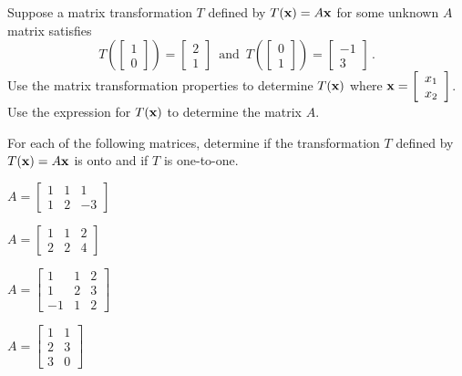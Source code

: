 \item Suppose a matrix transformation $T$ defined by $T(\mathbf{x})=A\mathbf{x}$ for some unknown $A$ matrix satisfies 
\[ T\left( \left[ \begin{array}{c} 1 \\ 0 \end{array} \right] \right) = \left[ \begin{array}{c} 2\\ 1\end{array} \right] \, \text{ and } \, T\left( \left[ \begin{array}{c} 0 \\ 1 \end{array} \right] \right) = \left[ \begin{array}{r} -1\\ 3\end{array} \right] \, . \] 
Use the matrix transformation properties to determine $T(\mathbf{x})$ where $\mathbf{x}= \left[ \begin{array}{c} x_1\\x_2 \end{array} \right]$. Use the expression for $T(\mathbf{x})$ to determine the matrix $A$.

\item For each of the following matrices, determine if the transformation $T$ defined by $T(\mathbf{x})=A\mathbf{x}$ is onto and if $T$ is one-to-one.

\ba
\item $A=\left[ \begin{array}{ccr} 1& 1 & 1 \\ 1 & 2 & -3 \end{array} \right]$

\item $A=\left[ \begin{array}{ccc} 1& 1 & 2 \\ 2 & 2 & 4 \end{array} \right]$

\item $A=\left[ \begin{array}{rcc} 1& 1 & 2 \\ 1 & 2 & 3 \\ -1 & 1 &2 \end{array} \right]$

\item $A=\left[ \begin{array}{cc} 1& 1 \\ 2 & 3 \\ 3 & 0 \end{array} \right]$
\ea

